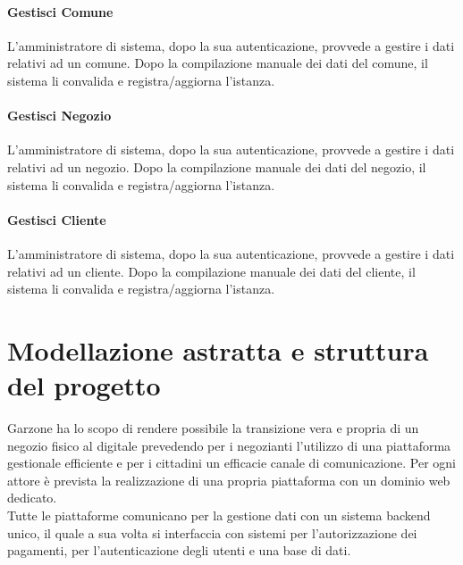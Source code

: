 \paragraph{Gestisci Comune} L'amministratore di sistema, dopo la sua autenticazione, provvede a gestire i dati relativi ad un comune. Dopo la compilazione manuale dei dati del comune, il sistema li convalida e registra/aggiorna l'istanza. 
\paragraph{Gestisci Negozio} L'amministratore di sistema, dopo la sua autenticazione, provvede a gestire i dati relativi ad un negozio. Dopo la compilazione manuale dei dati del negozio, il sistema li convalida e registra/aggiorna l'istanza. 
\paragraph{Gestisci Cliente} L'amministratore di sistema, dopo la sua autenticazione, provvede a gestire i dati relativi ad un cliente. Dopo la compilazione manuale dei dati del cliente, il sistema li convalida e registra/aggiorna l'istanza. 
\section{Modellazione astratta e struttura del progetto}
Garzone ha lo scopo di rendere possibile la transizione vera e propria di un negozio fisico al digitale prevedendo per i negozianti l'utilizzo di una piattaforma gestionale efficiente e per i cittadini un efficacie canale di comunicazione. Per ogni attore è prevista la realizzazione di una propria piattaforma con un dominio web dedicato. \\Tutte le piattaforme comunicano per la gestione dati con un sistema backend unico, il quale a sua volta si interfaccia con sistemi per l'autorizzazione dei pagamenti, per l'autenticazione degli utenti e una base di dati.
